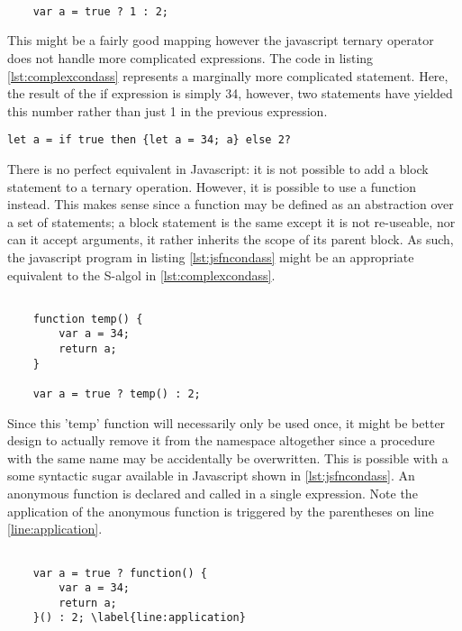 \documentclass{article}
\begin{document}
\begin{lstlisting}[caption=Javascript conditional assignment, label=lst:jscondass]

    var a = true ? 1 : 2;
\end{lstlisting}

This might be a fairly good mapping however the javascript ternary operator does not handle more complicated expressions. The code in listing \ref{lst:complexcondass} represents a marginally more complicated statement. Here, the result of the if expression is simply 34, however, two statements have yielded this number rather than just 1 in the previous expression.

\begin{lstlisting}[caption={More complicated S-Algol conditional assignment},label={lst:complexcondass}]
let a = if true then {let a = 34; a} else 2?
\end{lstlisting}

There is no perfect equivalent in Javascript: it is not possible to add a block statement to a ternary operation. However, it is possible to use a function instead. This makes sense since a function may be defined as an abstraction over a set of statements; a block statement is the same except it is not re-useable, nor can it accept arguments, it rather inherits the scope of its parent block. As such, the javascript program in listing \ref{lst:jsfncondass} might be an appropriate equivalent to the S-algol in \ref{lst:complexcondass}.


\begin{lstlisting}[caption=Javascript conditional assignment using a function, label=lst:jsfncondass]

    function temp() {
        var a = 34;
        return a;
    }
    
    var a = true ? temp() : 2;
\end{lstlisting}

Since this 'temp' function will necessarily only be used once, it might be better design to actually remove it from the namespace altogether since a procedure with the same name may be accidentally be overwritten. This is possible with a some syntactic sugar available in Javascript shown in \ref{lst:jsfncondass}. An anonymous function is declared and called in a single expression. Note the application of the anonymous function is triggered by the parentheses on line \ref{line:application}.

\begin{lstlisting}[caption=Javascript conditional assignment using an inline function, label=lst:jsinlinefncondass]

    var a = true ? function() {
        var a = 34;
        return a;
    }() : 2; \label{line:application}

\end{lstlisting}
\end{document}
